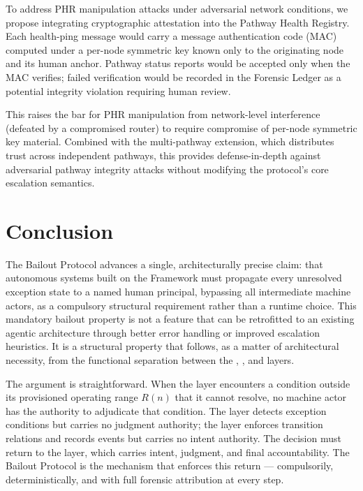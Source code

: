 To address PHR manipulation attacks under adversarial network conditions, we propose integrating cryptographic attestation into the Pathway Health Registry. Each health-ping message would carry a message authentication code (MAC) computed under a per-node symmetric key known only to the originating node and its human anchor. Pathway status reports would be accepted only when the MAC verifies; failed verification would be recorded in the Forensic Ledger as a potential integrity violation requiring human review.

This raises the bar for PHR manipulation from network-level interference (defeated by a compromised router) to require compromise of per-node symmetric key material. Combined with the multi-pathway extension, which distributes trust across independent pathways, this provides defense-in-depth against adversarial pathway integrity attacks without modifying the protocol's core escalation semantics.

\section{Conclusion}
\label{sec:conclusion}

The Bailout Protocol advances a single, architecturally precise claim: that autonomous systems built on the \bxthree{} Framework must propagate every unresolved exception state to a named human principal, bypassing all intermediate machine actors, as a compulsory structural requirement rather than a runtime choice. This mandatory bailout property is not a feature that can be retrofitted to an existing agentic architecture through better error handling or improved escalation heuristics. It is a structural property that follows, as a matter of architectural necessity, from the functional separation between the \purpose{}, \bounds{}, and \fact{} layers.

The argument is straightforward. When the \bounds{} layer encounters a condition outside its provisioned operating range $R(n)$ that it cannot resolve, no machine actor has the authority to adjudicate that condition. The \bounds{} layer detects exception conditions but carries no judgment authority; the \fact{} layer enforces transition relations and records events but carries no intent authority. The decision must return to the \purpose{} layer, which carries intent, judgment, and final accountability. The Bailout Protocol is the mechanism that enforces this return --- compulsorily, deterministically, and with full forensic attribution at every step.

